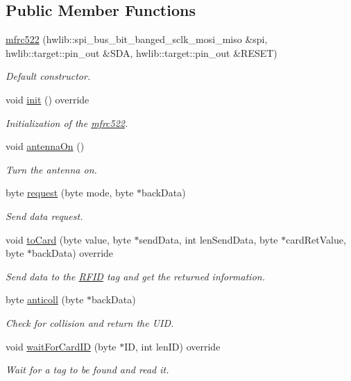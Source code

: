 \subsection*{Public Member Functions}
\begin{DoxyCompactItemize}
\item 
\hyperlink{classmfrc522_a7939e9c2b9c197a409489af7fe3c9da7}{mfrc522} (hwlib\+::spi\+\_\+bus\+\_\+bit\+\_\+banged\+\_\+sclk\+\_\+mosi\+\_\+miso \&spi, hwlib\+::target\+::pin\+\_\+out \&S\+DA, hwlib\+::target\+::pin\+\_\+out \&R\+E\+S\+ET)
\begin{DoxyCompactList}\small\item\em Default constructor. \end{DoxyCompactList}\item 
void \hyperlink{classmfrc522_ac0a0cf7f16b98c37826ce0e160877269}{init} () override
\begin{DoxyCompactList}\small\item\em Initialization of the \hyperlink{classmfrc522}{mfrc522}. \end{DoxyCompactList}\item 
void \hyperlink{classmfrc522_a7b93914a7f2e1fd587392c2949f16ab1}{antenna\+On} ()
\begin{DoxyCompactList}\small\item\em Turn the antenna on. \end{DoxyCompactList}\item 
byte \hyperlink{classmfrc522_a0e19de4c39b37cf31d45af78f0fad524}{request} (byte mode, byte $\ast$back\+Data)
\begin{DoxyCompactList}\small\item\em Send data request. \end{DoxyCompactList}\item 
void \hyperlink{classmfrc522_a6801b8481392f6310b40a6893f6544c2}{to\+Card} (byte value, byte $\ast$send\+Data, int len\+Send\+Data, byte $\ast$card\+Ret\+Value, byte $\ast$back\+Data) override
\begin{DoxyCompactList}\small\item\em Send data to the \hyperlink{class_r_f_i_d}{R\+F\+ID} tag and get the returned information. \end{DoxyCompactList}\item 
byte \hyperlink{classmfrc522_a0ecbb86c1ad7fe15ea404f5bd8f30297}{anticoll} (byte $\ast$back\+Data)
\begin{DoxyCompactList}\small\item\em Check for collision and return the U\+ID. \end{DoxyCompactList}\item 
void \hyperlink{classmfrc522_a18665350caf822a716f2a72674a21647}{wait\+For\+Card\+ID} (byte $\ast$ID, int len\+ID) override
\begin{DoxyCompactList}\small\item\em Wait for a tag to be found and read it. \end{DoxyCompactList}\end{DoxyCompactItemize}
